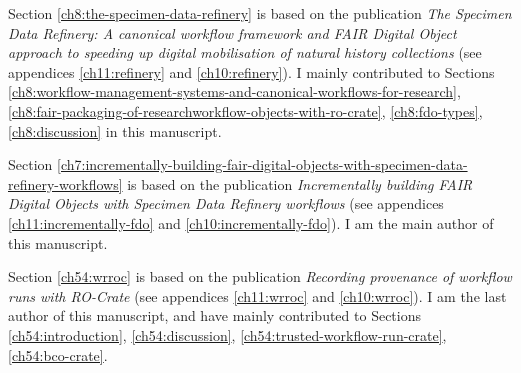 Section \ref{ch8:the-specimen-data-refinery} is based on the publication \emph{The Specimen Data Refinery: A
canonical workflow framework and FAIR Digital Object approach to speeding up digital mobilisation of natural history collections} \cite{Hardisty 2022} (see appendices \ref{ch11:refinery} and \ref{ch10:refinery}). I mainly contributed to Sections \ref{ch8:workflow-management-systems-and-canonical-workflows-for-research}, \ref{ch8:fair-packaging-of-researchworkflow-objects-with-ro-crate}, \ref{ch8:fdo-types}, \ref{ch8:discussion} in this manuscript.

Section \ref{ch7:incrementally-building-fair-digital-objects-with-specimen-data-refinery-workflows} is based on the publication \emph{Incrementally building FAIR Digital Objects with Specimen Data
Refinery workflows} \cite{Woolland 2022} (see appendices \ref{ch11:incrementally-fdo} and \ref{ch10:incrementally-fdo}). I am the main author of this manuscript.

Section \ref{ch54:wrroc} is based on the publication \emph{
Recording provenance of workflow runs with RO-Crate} \cite{Leo 2023b} (see appendices \ref{ch11:wrroc} and \ref{ch10:wrroc}). I am the last author of this manuscript, and have mainly contributed to Sections \ref{ch54:introduction}, \ref{ch54:discussion}, \ref{ch54:trusted-workflow-run-crate}, \ref{ch54:bco-crate}.
